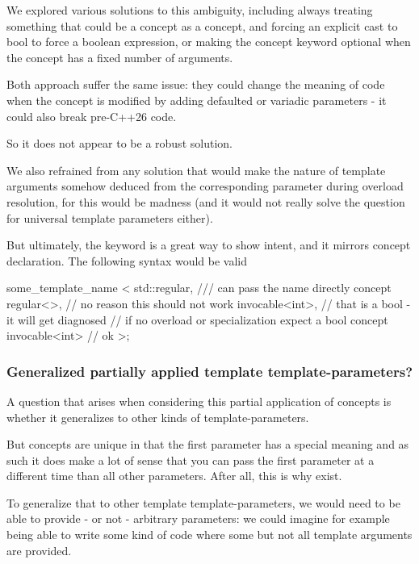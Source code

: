 \documentclass{wg21}
\begin{document}
We explored various solutions to this ambiguity, including always treating something that could be a concept as a concept,
and forcing an explicit cast to bool to force a boolean expression, or making the concept keyword optional when the concept has a fixed number of arguments.

Both approach suffer the same issue: they could change the meaning of code when the concept is modified by adding defaulted or variadic
parameters - it could also break pre-C++26 code.

So it does not appear to be a robust solution.

We also refrained from any solution that would make the nature of template arguments somehow deduced from the corresponding parameter
during overload resolution, for this would be madness (and it would not really solve the question for universal template parameters either).

But ultimately, the  keyword is a great way to show intent, and it mirrors concept declaration. The following syntax would be valid

\begin{colorblock}
some_template_name <
    std::regular,  /// can pass the name directly
    concept regular<>, // no reason this should not work
    invocable<int>, // that is a bool - it will get diagnosed
                    // if no overload or specialization expect a bool
    concept invocable<int> // ok
>;
\end{colorblock}

\subsubsection{Generalized partially applied template template-parameters?}

A question that arises when considering this partial application of concepts is whether it generalizes to other kinds of template-parameters.

But concepts are unique in that the first parameter has a special meaning and as such it does make a lot of sense
that you can pass the first parameter at a different time than all other parameters.
After all, this is why  exist.

To generalize that to other template template-parameters, we would need to be able to provide - or not - arbitrary parameters:
we could imagine for example being able to write some kind of code where some but not all template arguments are provided.
\end{document}
